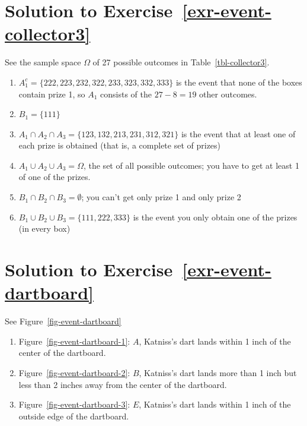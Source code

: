 \documentclass[
  letterpaper,
  DIV=11,
  numbers=noendperiod]{scrreprt}
\providecommand{\tightlist}{%
  \setlength{\itemsep}{0pt}\setlength{\parskip}{0pt}}
\theoremstyle{plain}
\theoremstyle{definition}
\theoremstyle{definition}
\theoremstyle{definition}
\theoremstyle{remark}
\begin{document}
\section{\texorpdfstring{Solution to
Exercise~\ref{exr-event-collector3}}{Solution to Exercise~}}\label{solution-to-exr-event-collector3}

See the sample space \(\Omega\) of 27 possible outcomes in
Table~\ref{tbl-collector3}.

\begin{enumerate}
\def\labelenumi{\arabic{enumi}.}
\tightlist
\item
  \(A_1^c = \{222, 223, 232, 322, 233, 323, 332, 333\}\) is the event
  that none of the boxes contain prize 1, so \(A_1\) consists of the
  \(27-8 = 19\) other outcomes.
\item
  \(B_1 = \{111\}\)
\item
  \(A_1 \cap A_2 \cap A_3 = \{123, 132, 213, 231, 312, 321\}\) is the
  event that at least one of each prize is obtained (that is, a complete
  set of prizes)
\item
  \(A_1 \cup A_2 \cup A_3 = \Omega\), the set of all possible outcomes;
  you have to get at least 1 of one of the prizes.
\item
  \(B_1 \cap B_2 \cap B_3=\emptyset\); you can't get only prize 1 and
  only prize 2
\item
  \(B_1 \cup B_2 \cup B_3 = \{111, 222, 333\}\) is the event you only
  obtain one of the prizes (in every box)
\end{enumerate}

\section{\texorpdfstring{Solution to
Exercise~\ref{exr-event-dartboard}}{Solution to Exercise~}}\label{solution-to-exr-event-dartboard}

See Figure~\ref{fig-event-dartboard}

\begin{enumerate}
\def\labelenumi{\arabic{enumi}.}
\tightlist
\item
  Figure~\ref{fig-event-dartboard-1}: \(A\), Katniss's dart lands within
  1 inch of the center of the dartboard.
\item
  Figure~\ref{fig-event-dartboard-2}: \(B\), Katniss's dart lands more
  than 1 inch but less than 2 inches away from the center of the
  dartboard.
\item
  Figure~\ref{fig-event-dartboard-3}: \(E\), Katniss's dart lands within
  1 inch of the outside edge of the dartboard.
\end{enumerate}
\end{document}
